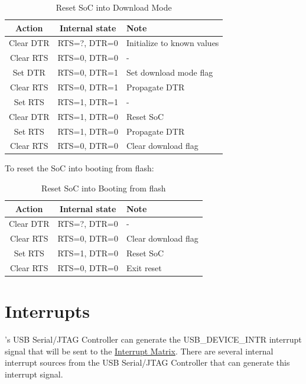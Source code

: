 \documentclass[main\_\_EN.tex]{subfiles}
\begin{document}
\begin{table}[H]
\centering
\caption{Reset SoC into Download Mode}
\label{tab:usbserialjtag-reset-soc-into-download-mode}

\begin{tabular} {|c|c|l|}\hline
\rowcolor{lightgray}
\textbf{Action} & \textbf{Internal state} & \textbf{Note} \\\hline

Clear DTR & RTS=?, DTR=0 & Initialize to known values \\\hline
Clear RTS & RTS=0, DTR=0 & - \\\hline
Set DTR & RTS=0, DTR=1 & Set download mode flag \\\hline
Clear RTS & RTS=0, DTR=1 & Propagate DTR \\\hline
Set RTS & RTS=1, DTR=1 & - \\\hline
Clear DTR & RTS=1, DTR=0 & Reset SoC \\\hline
Set RTS & RTS=1, DTR=0 & Propagate DTR \\\hline
Clear RTS & RTS=0, DTR=0 & Clear download flag\\\hline
\end{tabular}
\end{table}

To reset the SoC into booting from flash:

\begin{table}[H]
\centering
\caption{Reset SoC into Booting from flash}
\label{tab:usbserialjtag-reset-soc-into-booting}

\begin{tabular} {|c|c|l|}\hline
\rowcolor{lightgray}
\textbf{Action} & \textbf{Internal state} & \textbf{Note} \\\hline

Clear DTR & RTS=?, DTR=0 & - \\\hline
Clear RTS & RTS=0, DTR=0 &  Clear download flag \\\hline
Set RTS & RTS=1, DTR=0 & Reset SoC \\\hline
Clear RTS & RTS=0, DTR=0 & Exit reset \\\hline
\end{tabular}
\end{table}

\section{Interrupts}

\chipname{}'s USB Serial/JTAG Controller can generate the USB\_DEVICE\_INTR interrupt signal that will be sent to the \hyperref[mod:intmtrx]{Interrupt Matrix}. There are several internal interrupt sources from the USB Serial/JTAG Controller that can generate this interrupt signal.
\end{document}
